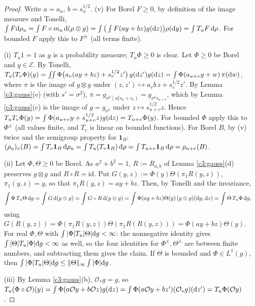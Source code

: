 \begin{proof}
Write $a=a_u$, $b=s_u^{1/2}$.
(v) For Borel $F\ge0$, by definition of the image measure and Tonelli, $\int F\mathrm{d}\rho_u=\int F\circ m_u\,\mathrm{d}(\rho\otimes g)=\int\big(\int F(ay+bz)g(\mathrm{d} z)\big)\rho(\mathrm{d} y)=\int T_uF\,\mathrm{d}\rho$. For bounded $F$ apply this to $F^\pm$ (all terms finite).

(i) $T_u1=1$ as $g$ is a probability measure; $T_u\Phi\ge0$ is clear. Let $\Phi\ge0$ be Borel and $y\in\mathcal E$. By Tonelli,
$T_u(T_v\Phi)(y)=\int\!\!\int\Phi\big(a_v(ay+bz)+s_v^{1/2}z'\big)\,g(\mathrm{d} z')g(\mathrm{d} z)=\int\Phi(a_{u+v}y+w)\,\pi(\mathrm{d} w)$,
where $\pi$ is the image of $g\otimes g$ under $(z,z')\mapsto a_vb\,z+s_v^{1/2}z'$. By Lemma \ref{c3:gauss}(e) (with $s'=\sigma^2$), $\pi=g_{\sigma^2(a_v^2s_u+s_v)}=g_{\sigma^2s_{u+v}}$, which by Lemma \ref{c3:gauss}(c) is the image of $g=g_{\sigma^2}$ under $z\mapsto s_{u+v}^{1/2}z$. Hence $T_uT_v\Phi(y)=\int\Phi(a_{u+v}y+s_{u+v}^{1/2}z)g(\mathrm{d} z)=T_{u+v}\Phi(y)$.
For bounded $\Phi$ apply this to $\Phi^\pm$ (all values finite, and $T_v$ is linear on bounded functions).
For Borel $B$, by (v) twice and the semigroup property for $\mathbf 1_B$: $(\rho_u)_v(B)=\int T_v\mathbf 1_B\,\mathrm{d}\rho_u=\int T_u(T_v\mathbf 1_B)\,\mathrm{d}\rho=\int T_{u+v}\mathbf 1_B\,\mathrm{d}\rho=\rho_{u+v}(B)$.

(ii) Let $\Phi,\Theta\ge0$ be Borel. As $a^2+b^2=1$, $R:=R_{a,b}$ of Lemma \ref{c3:gauss}(d) preserves $g\otimes g$ and $R\circ R=\mathrm{id}$. Put $G(y,z):=\Phi(y)\Theta(\pi_1R(y,z))$, $\pi_1(y,z)=y$, so that $\pi_1R(y,z)=ay+bz$. Then, by Tonelli and the invariance,
\[
\int\Phi\,T_u\Theta\,\mathrm{d} g=\int G\,\mathrm{d}(g\otimes g)=\int G\circ R\,\mathrm{d}(g\otimes g)=\int\Phi(ay+bz)\Theta(y)\,(g\otimes g)(\mathrm{d} y,\mathrm{d} z)=\int\Theta\,T_u\Phi\,\mathrm{d} g ,
\]
using $G(R(y,z))=\Phi(\pi_1R(y,z))\Theta(\pi_1R(R(y,z)))=\Phi(ay+bz)\Theta(y)$.
For real $\Phi,\Theta$ with $\int|\Phi|T_u|\Theta|\mathrm{d} g<\infty$: the nonnegative identity gives $\int|\Theta|T_u|\Phi|\mathrm{d} g<\infty$ as well, so the four identities for $\Phi^\pm,\Theta^\pm$ are between finite numbers, and subtracting them gives the claim. If $\Theta$ is bounded and $\Phi\in L^1(g)$, then $\int|\Phi|T_u|\Theta|\mathrm{d} g\le\|\Theta\|_\infty\int|\Phi|\mathrm{d} g$.

(iii) By Lemma \ref{c3:gauss}(b), $\mathcal O_*g=g$, so $T_u(\Phi\circ\mathcal O)(y)=\int\Phi(a\mathcal Oy+b\mathcal Oz)g(\mathrm{d} z)=\int\Phi(a\mathcal Oy+bz')(\mathcal O_*g)(\mathrm{d} z')=T_u\Phi(\mathcal Oy)$.


\end{proof}
